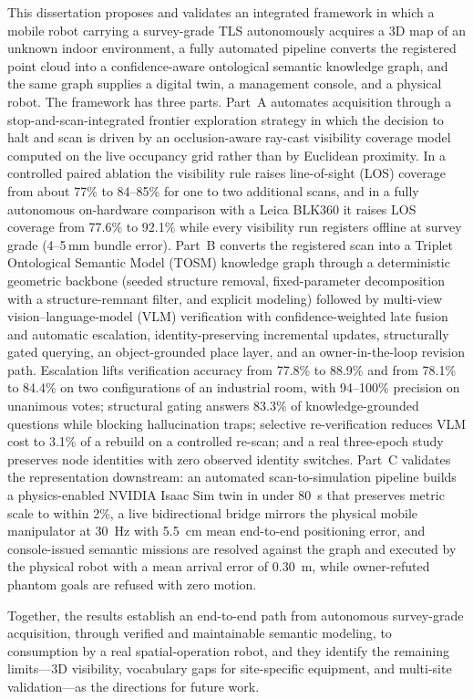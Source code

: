 \documentclass[11pt,a4paper]{skkuthesis}
\begin{document}
\begin{englishabstract}
This dissertation proposes and validates an integrated framework in which a
mobile robot carrying a survey-grade TLS autonomously acquires a 3D map of an
unknown indoor environment, a fully automated pipeline converts the registered
point cloud into a confidence-aware ontological semantic knowledge graph, and
the same graph supplies a digital twin, a management console, and a physical
robot. The framework has three parts. Part~A automates acquisition through a
stop-and-scan-integrated frontier exploration strategy in which the decision to
halt and scan is driven by an occlusion-aware ray-cast visibility coverage
model computed on the live occupancy grid rather than by Euclidean proximity.
In a controlled paired ablation the visibility rule raises line-of-sight (LOS)
coverage from about 77\% to 84--85\% for one to two additional scans, and in a
fully autonomous on-hardware comparison with a Leica BLK360 it raises LOS
coverage from 77.6\% to 92.1\% while every visibility run registers offline at
survey grade (4--5\,mm bundle error). Part~B converts the registered scan into
a Triplet Ontological Semantic Model (TOSM) knowledge graph through a
deterministic geometric backbone (seeded structure removal, fixed-parameter
decomposition with a structure-remnant filter, and explicit modeling) followed
by multi-view vision--language-model (VLM) verification with confidence-weighted
late fusion and automatic escalation, identity-preserving incremental updates,
structurally gated querying, an object-grounded place layer, and an
owner-in-the-loop revision path. Escalation lifts verification accuracy from
77.8\% to 88.9\% and from 78.1\% to 84.4\% on two configurations of an
industrial room, with 94--100\% precision on unanimous votes; structural gating
answers 83.3\% of knowledge-grounded questions while blocking hallucination
traps; selective re-verification reduces VLM cost to 3.1\% of a rebuild on a
controlled re-scan; and a real three-epoch study preserves node identities with
zero observed identity switches. Part~C validates the representation downstream:
an automated scan-to-simulation pipeline builds a physics-enabled NVIDIA Isaac
Sim twin in under 80~s that preserves metric scale to within 2\%, a live
bidirectional bridge mirrors the physical mobile manipulator at 30~Hz with 5.5~cm
mean end-to-end positioning error, and console-issued semantic missions are
resolved against the graph and executed by the physical robot with a mean
arrival error of 0.30~m, while owner-refuted phantom goals are refused with
zero motion.

Together, the results establish an end-to-end path from autonomous survey-grade
acquisition, through verified and maintainable semantic modeling, to
consumption by a real spatial-operation robot, and they identify the remaining
limits---3D visibility, vocabulary gaps for site-specific equipment, and
multi-site validation---as the directions for future work.
\end{englishabstract}
\end{document}
